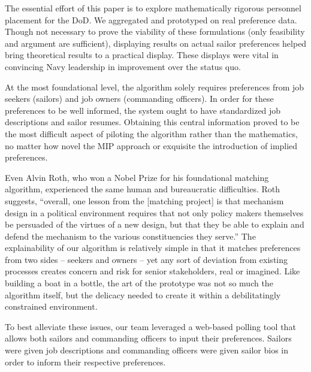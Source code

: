 The essential effort of this paper is to explore mathematically rigorous personnel placement for the DoD. We aggregated and prototyped on real preference data. Though not necessary to prove the viability of these formulations (only feasibility and argument are sufficient), displaying results on actual sailor preferences helped bring theoretical results to a practical display. These displays were vital in convincing Navy leadership in improvement over the status quo.

At the most foundational level, the algorithm solely requires preferences from job seekers (sailors) and job owners (commanding officers). In order for these preferences to be well informed, the system ought to have standardized job descriptions and sailor resumes.  Obtaining this central information proved to be the most difficult aspect of piloting the algorithm rather than the mathematics, no matter how novel the MIP approach or exquisite the introduction of implied preferences. 

Even Alvin Roth, who won a Nobel Prize for his foundational matching algorithm, experienced the same human and bureaucratic difficulties. Roth suggests, ``overall, one lesson from the [matching project] is that mechanism design in a political environment requires that not only policy makers themselves be persuaded of the virtues of a new design, but that they be able to explain and defend the mechanism to the various constituencies they serve.''
\citep{2006_Atila} The explainability of our algorithm is relatively simple in that it matches preferences from two sides -- seekers and owners -- yet any sort of deviation from existing processes creates concern and risk for senior stakeholders, real or imagined. Like building a boat in a bottle, the art of the prototype was not so much the algorithm itself, but the delicacy needed to create it within a debilitatingly constrained environment.

To best alleviate these issues, our team leveraged a web-based polling tool that allows both sailors and commanding officers to input their preferences. Sailors were given job descriptions and commanding officers were given sailor bios in order to inform their respective preferences. 
